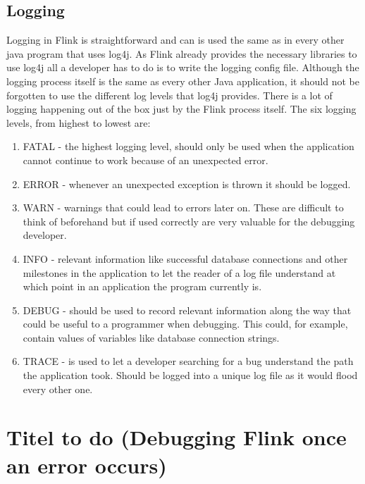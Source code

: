 \subsection{Logging}
Logging in Flink is straightforward and can is used the same as in every other java program that uses log4j. As Flink already provides the necessary libraries to use log4j all a developer has to do is to write the logging config file. Although the logging process itself is the same as every other Java application, it should not be forgotten to use the different log levels that log4j provides. There is a lot of logging happening out of the box just by the Flink process itself. The six logging levels, from highest to lowest are:
\begin{enumerate}
  \item FATAL - the highest logging level, should only be used when the application cannot continue to work because of an unexpected error.
  \item ERROR - whenever an unexpected exception is thrown it should be logged.
  \item WARN - warnings that could lead to errors later on. These are difficult to think of beforehand but if used correctly are very valuable for the debugging developer.
  \item INFO - relevant information like successful database connections and other milestones in the application to let the reader of a log file understand at which point in an application the program currently is.
  \item DEBUG - should be used to record relevant information along the way that could be useful to a programmer when debugging. This could, for example, contain values of variables like database connection strings.
  \item TRACE - is used to let a developer searching for a bug understand the path the application took. Should be logged into a unique log file as it would flood every other one.
\end{enumerate}

\section{Titel to do (Debugging Flink once an error occurs)}
